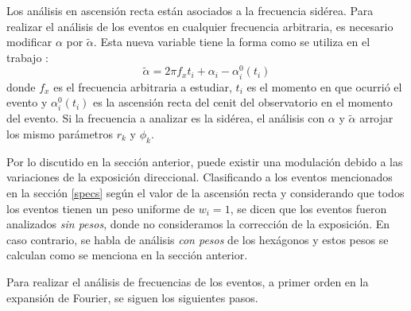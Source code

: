   Los análisis en ascensión recta están asociados a la frecuencia sidérea.  Para realizar el análisis de los eventos en cualquier frecuencia arbitraria, es necesario modificar $\alpha$ por $\tilde{\alpha}$. Esta nueva variable tiene la forma como se utiliza en el trabajo \cite{taborda}:
  \begin{equation}
    \tilde{\alpha} = 2\pi f_x t_i + \alpha_i - \alpha_i^0(t_i) \label{ra_mod}
  \end{equation}
  donde $f_x$ es el frecuencia arbitraria a estudiar, $t_i$ es el momento en que ocurrió el evento y $\alpha_i^0(t_i)$ es la ascensión recta del cenit del observatorio en el momento del evento. Si la frecuencia a analizar es la sidérea, el análisis con $\alpha$ y $\tilde{\alpha}$ arrojar los mismo parámetros $r_k$ y $\phi_k$.

  Por lo discutido en la sección anterior, puede existir una modulación debido a las variaciones de la exposición direccional.  Clasificando a los eventos mencionados en la sección \ref{specs} según el valor de la ascensión recta y considerando que todos los eventos tienen un peso uniforme de $w_i=1$, se dicen que los eventos fueron analizados \textit{sin pesos}, donde no consideramos la corrección de la exposición. En caso contrario, se habla de análisis \textit{con pesos} de los hexágonos  y estos pesos se calculan como se menciona en la sección anterior.

  Para realizar el análisis de frecuencias de los eventos, a primer orden en la expansión de Fourier, se siguen los siguientes pasos.

